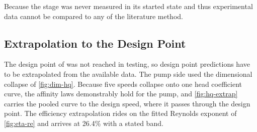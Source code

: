 Because the stage was never measured in its started state and thus experimental data cannot be compared to any of the literature method. %

\subsection{Extrapolation to the Design Point}

The design point of \valPumpRpmDesign{} was not reached in testing, so design point predictions have to be extrapolated from the available data. The pump side used the dimensional collapse of \cref{fig:dim-hq}. Because five speeds collapse onto one head coefficient curve, the affinity laws demonstrably hold for the pump, and \cref{fig:hq-extrap} carries the pooled curve to the design speed, where it passes through the design point. The efficiency extrapolation rides on the fitted Reynolds exponent of \cref{fig:eta-re} and arrives at 26.4\% with a stated band.

